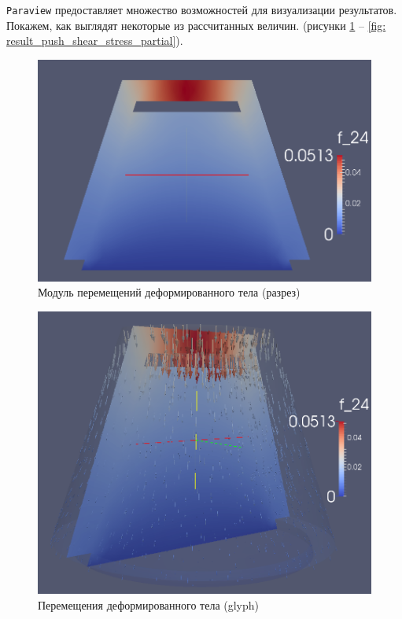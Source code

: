 \documentclass[a4paper, 14pt]{extreport}
\begin{document}
\texttt{Paraview} предоставляет множество возможностей
для визуализации результатов.
Покажем, как выглядят некоторые из рассчитанных величин.
(рисунки \ref{fig: result_push_displacement_slice} -- 
\ref{fig: result_push_shear_stress_partial}).

\begin{figure}[H]
	\center
	\includegraphics[scale=0.4]{pictures/result_push_displacement_slice.png}
	\caption{Модуль перемещений деформированного тела (разрез)}
	\label{fig: result_push_displacement_slice}
\end{figure}

\begin{figure}[H]
	\center
	\includegraphics[scale=0.5]{pictures/result_push_displacement_glyph.png}
	\caption{Перемещения деформированного тела (glyph)}
	\label{fig: result_push_displacement_glyph}
\end{figure}
\end{document}
